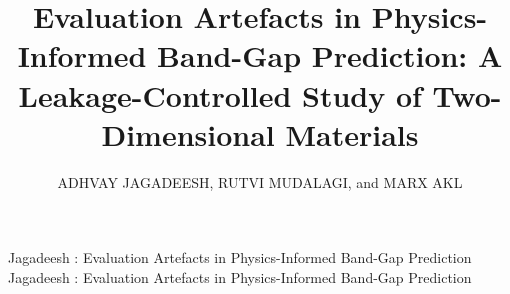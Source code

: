 \documentclass{ieeeaccess}
\begin{document}

\title{Evaluation Artefacts in Physics-Informed Band-Gap Prediction:
A Leakage-Controlled Study of Two-Dimensional Materials}

\author{\uppercase{Adhvay Jagadeesh}, \uppercase{Rutvi Mudalagi}, and \uppercase{Marx Akl}}
\address[1]{Aspiring Scholars Directed Research Program (ASDRP), Fremont, CA 94539 USA (e-mail: adhvay.jagadeesh@students.asdrp.org; rutvi.mudalagi@students.asdrp.org; makl@asdrp.org)}


\markboth
{Jagadeesh \headeretal: Evaluation Artefacts in Physics-Informed Band-Gap Prediction}
{Jagadeesh \headeretal: Evaluation Artefacts in Physics-Informed Band-Gap Prediction}

\end{document}
